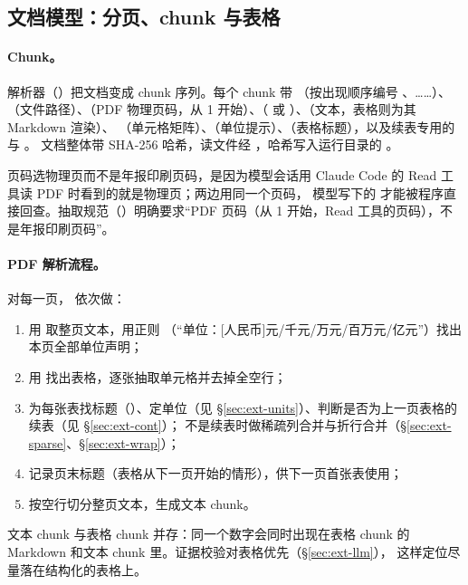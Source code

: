 \subsection{文档模型：分页、chunk 与表格}
\label{sec:ext-doc}

\paragraph{Chunk。}
解析器（）把文档变成 chunk 序列。每个 chunk 带 （按出现顺序编号 、……）、
（文件路径）、（PDF 物理页码，从 1 开始）、（ 或 ）、（文本，表格则为其 Markdown 渲染）、
（单元格矩阵）、（单位提示）、（表格标题），以及续表专用的  与 。
文档整体带 SHA-256 哈希，读文件经 ，哈希写入运行目录的 。

页码选物理页而不是年报印刷页码，是因为模型会话用 Claude Code 的 Read 工具读 PDF 时看到的就是物理页；两边用同一个页码，
模型写下的  才能被程序直接回查。抽取规范（）明确要求“PDF 页码（从 1 开始，Read 工具的页码），不是年报印刷页码”。

\paragraph{PDF 解析流程。}
对每一页， 依次做：
\begin{enumerate}
\item 用  取整页文本，用正则 （“单位：[人民币]元/千元/万元/百万元/亿元”）找出本页全部单位声明；
\item 用  找出表格，逐张抽取单元格并去掉全空行；
\item 为每张表找标题（）、定单位（见 \S\ref{sec:ext-units}）、判断是否为上一页表格的续表（见 \S\ref{sec:ext-cont}）；
      不是续表时做稀疏列合并与折行合并（\S\ref{sec:ext-sparse}、\S\ref{sec:ext-wrap}）；
\item 记录页末标题（表格从下一页开始的情形），供下一页首张表使用；
\item 按空行切分整页文本，生成文本 chunk。
\end{enumerate}
文本 chunk 与表格 chunk 并存：同一个数字会同时出现在表格 chunk 的 Markdown 和文本 chunk 里。证据校验对表格优先（\S\ref{sec:ext-llm}），
这样定位尽量落在结构化的表格上。


